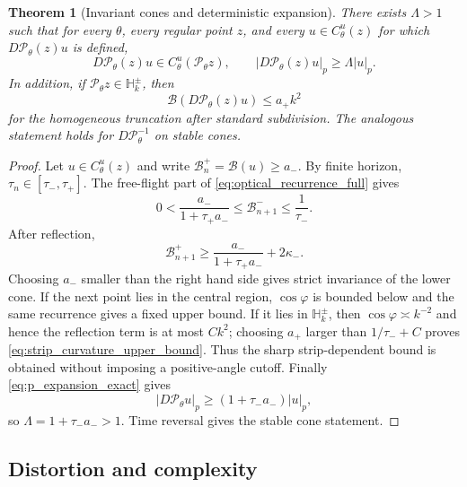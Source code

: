 \documentclass[12pt, letterpaper]{amsart}
\newcommand{\Pcal}{\mathcal{P}}
\theoremstyle{plain}
\newtheorem{theorem}{Theorem}[section]
\theoremstyle{definition}
\theoremstyle{remark}
\begin{document}
\begin{theorem}[Invariant cones and deterministic expansion]
\label{thm:cone_expansion}
\label{thm:invariant_cones_expansion}
There exists $\Lambda>1$ such that for every $\theta$, every regular point
$z$, and every $u\in C^u_\theta(z)$ for which $D\Pcal_\theta(z)u$ is defined,
\begin{equation}
    D\Pcal_\theta(z)u\in C^u_\theta(\Pcal_\theta z),
    \qquad
    |D\Pcal_\theta(z)u|_p\ge \Lambda |u|_p .
\end{equation}
In addition, if $\Pcal_\theta z\in\mathbb H_k^\pm$, then
\begin{equation}
\label{eq:strip_curvature_upper_bound}
    \mathcal B(D\Pcal_\theta(z)u)\le a_+ k^2
\end{equation}
for the homogeneous truncation after standard subdivision.  The analogous
statement holds for $D\Pcal_\theta^{-1}$ on stable cones.
\end{theorem}

\begin{proof}
Let $u\in C^u_\theta(z)$ and write $\mathcal B_n^+=\mathcal B(u)\ge a_-$.  By
finite horizon, $\tau_n\in[\tau_-,\tau_+]$.  The free-flight part of
\eqref{eq:optical_recurrence_full} gives
\begin{equation}
    0<\frac{a_-}{1+\tau_+a_-}
    \le \mathcal B_{n+1}^-
    \le \frac1{\tau_-} .
\end{equation}
After reflection,
\begin{equation}
    \mathcal B_{n+1}^+
    \ge \frac{a_-}{1+\tau_+a_-}+2\kappa_- .
\end{equation}
Choosing $a_-$ smaller than the right hand side gives strict invariance of the
lower cone.  If the next point lies in the central region, $\cos\varphi$ is
bounded below and the same recurrence gives a fixed upper bound.  If it lies in
$\mathbb H_k^\pm$, then $\cos\varphi\asymp k^{-2}$ and hence the reflection term
is at most $Ck^2$; choosing $a_+$ larger than $1/\tau_-+C$ proves
\eqref{eq:strip_curvature_upper_bound}.  Thus the sharp strip-dependent bound is obtained without imposing a positive-angle cutoff.
Finally \eqref{eq:p_expansion_exact} gives
\begin{equation}
    |D\Pcal_\theta u|_p\ge (1+\tau_-a_-)|u|_p,
\end{equation}
so $\Lambda=1+\tau_-a_->1$.  Time reversal gives the stable cone statement.
\end{proof}

\subsection{Distortion and complexity}
\end{document}
